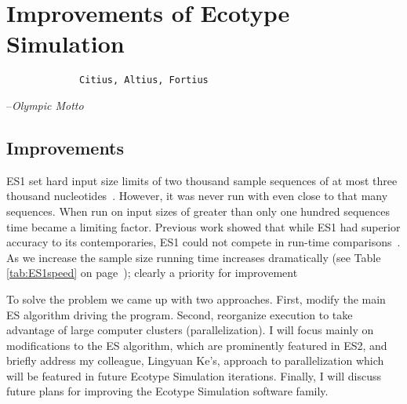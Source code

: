 \gobbletocpage
\chapter{Improvements of Ecotype Simulation}
\restoretocpage

\begin{shadequote}
\begin{center}
    \Large\begin{verbatim} 
             Citius, Altius, Fortius
 \end{verbatim}  
\end{center}
\par--\emph{Olympic Motto}
\end{shadequote}


\section{Improvements}
ES1 set hard input size limits of two thousand sample sequences of at most three thousand nucleotides~\cite{koeppel2008identifying}.
However, it was never run with even close to that many sequences.
When run on input sizes of greater than only one hundred sequences time became a limiting factor.
Previous work showed that while ES1 had superior  accuracy to its contemporaries, ES1 could not compete in run-time comparisons~\cite{carlo}.
As we increase the sample size running time increases dramatically (see Table \ref{tab:ES1speed} on page~\pageref{tab:ES1speed}); clearly a priority for improvement

To solve the problem we came up with two approaches.
First, modify the main ES algorithm driving the program.
Second, reorganize execution to take advantage of large computer clusters (parallelization).
I will focus mainly on modifications to the ES algorithm, which are prominently featured in ES2, and briefly address my colleague, Lingyuan Ke's, approach to parallelization which will be featured in future Ecotype Simulation iterations.
Finally, I will discuss future plans for improving the Ecotype Simulation software family.


